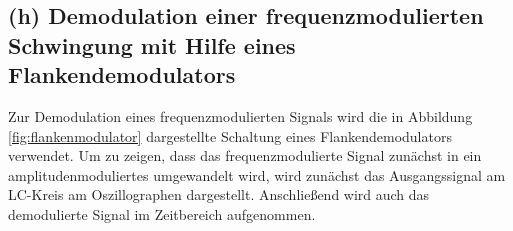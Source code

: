 \FloatBarrier
\subsection{(h) Demodulation einer frequenzmodulierten Schwingung
mit Hilfe eines Flankendemodulators}
\label{subsec:durchfuehrung_h}
Zur Demodulation eines frequenzmodulierten Signals wird die in Abbildung
\ref{fig:flankenmodulator} dargestellte Schaltung eines Flankendemodulators verwendet.
Um zu zeigen, dass das frequenzmodulierte Signal zunächst in ein
amplitudenmoduliertes umgewandelt wird, wird zunächst das Ausgangssignal
am LC-Kreis am Oszillographen dargestellt. Anschließend wird
auch das demodulierte Signal im Zeitbereich aufgenommen.
